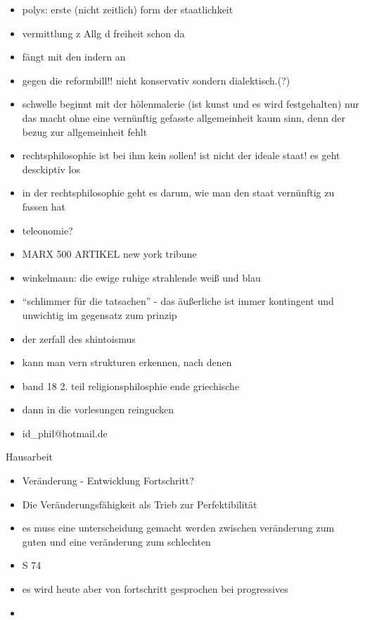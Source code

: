 \documentclass[emulatestandardclasses]{scrartcl}
\begin{document}
\begin{itemize}
  \item polys: erste (nicht zeitlich) form der staatlichkeit
  \item vermittlung z Allg d freiheit schon da
  \item fängt mit den indern an
  \item gegen die reformbill!! nicht konservativ sondern dialektisch.(?)
  \item schwelle beginnt mit der hölenmalerie (ist kunst und es wird festgehalten) nur das macht ohne eine vernünftig gefasste allgemeinheit kaum sinn, denn der bezug zur allgemeinheit fehlt
  \item rechtsphilosophie ist bei ihm kein sollen! ist nicht der ideale staat! es geht desckiptiv los
  \item in der rechtsphilosophie geht es darum, wie man den staat vernünftig zu fassen hat
  \item teleonomie?
  \item MARX 500 ARTIKEL new york tribune
  \item winkelmann: die ewige ruhige strahlende weiß und blau
  \item "`schlimmer für die tatsachen"' - das äußerliche ist immer kontingent und unwichtig im gegensatz zum prinzip
  \item der zerfall des shintoismus
  \item kann man vern strukturen erkennen, nach denen 
  \item band 18 2. teil religionsphilosphie ende griechische
  \item dann in die vorlesungen reingucken
  \item id_phil@hotmail.de
\end{itemize}


Hausarbeit

\begin{itemize}
  \item Veränderung - Entwicklung Fortschritt?
  \item Die Veränderungsfähigkeit als Trieb zur Perfektibilität
  \item es muss eine unterscheidung gemacht werden zwischen veränderung zum guten und eine veränderung zum schlechten
  \item S 74
  \item es wird heute aber von fortschritt gesprochen bei progressives
  \item 
\end{itemize}
\end{document}
